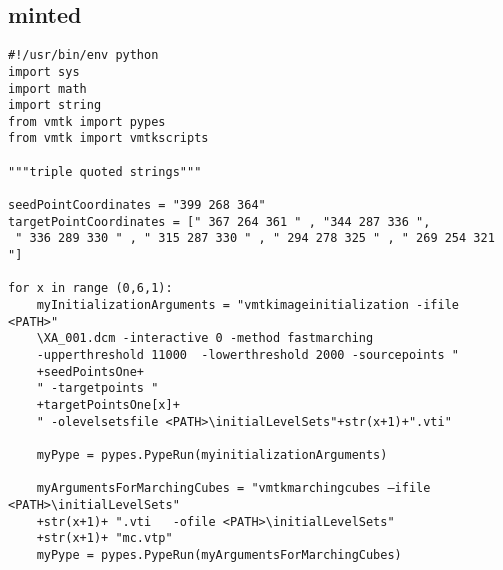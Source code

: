 \documentclass{article}
\begin{document}
\subsection{minted}
\begin{verbatim}
#!/usr/bin/env python
import sys
import math
import string
from vmtk import pypes
from vmtk import vmtkscripts

"""triple quoted strings"""

seedPointCoordinates = "399 268 364"
targetPointCoordinates = [" 367 264 361 " , "344 287 336 ",
 " 336 289 330 " , " 315 287 330 " , " 294 278 325 " , " 269 254 321 "]

for x in range (0,6,1):
    myInitializationArguments = "vmtkimageinitialization -ifile <PATH>" 
    \XA_001.dcm -interactive 0 -method fastmarching
    -upperthreshold 11000  -lowerthreshold 2000 -sourcepoints " 
    +seedPointsOne+ 
    " -targetpoints "
    +targetPointsOne[x]+
    " -olevelsetsfile <PATH>\initialLevelSets"+str(x+1)+".vti"

    myPype = pypes.PypeRun(myinitializationArguments)

    myArgumentsForMarchingCubes = "vmtkmarchingcubes –ifile <PATH>\initialLevelSets" 
    +str(x+1)+ ".vti   -ofile <PATH>\initialLevelSets"
    +str(x+1)+ "mc.vtp"
    myPype = pypes.PypeRun(myArgumentsForMarchingCubes)
\end{verbatim}
\end{document}

